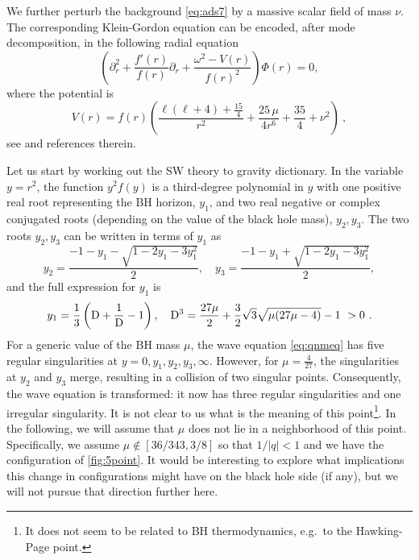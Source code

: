 \documentclass[11pt]{article}
\numberwithin{equation}{section}
\newcommand{\be}{\begin{equation}}
\newcommand{\ee}{\end{equation}}
\begin{document}
We further perturb the background \eqref{eq:ads7} by a massive scalar field of mass $\nu$. 
%
The corresponding Klein-Gordon equation can be encoded, after mode decomposition, in the following radial equation 
\begin{equation}\label{eq:qnmeq}
\left(\partial^2_r + \frac{f'(r)}{f(r)} \partial_r +\frac{\omega^2-V(r)}{f(r)^2}\right)\Phi(r)=0,
\end{equation}
where the potential is  
\begin{equation}
V(r)= f(r)\left(\frac{\ell(\ell+4)+\frac{15}{4}}{r^2}+\frac{25\,\mu}{4 r^6}+\frac{35}{4}+\nu^2\right)~,
\end{equation}
see \cite{review} and references therein.
 
Let us start by working out the SW theory to gravity dictionary. In the variable $y=r^2$, the function $y^2f(y)$ is a third-degree polynomial in $y$ with one positive real root representing the BH horizon, $y_1$, and two real negative or complex conjugated roots (depending on the value of the black hole mass), $y_2,y_3$. The two roots $y_2,y_3$ can be written in terms of $y_1$ as
\begin{equation}
y_2=\frac{-1-y_1-\sqrt{1-2y_1-3y_1^2}}{2},\quad y_3=\frac{-1-y_1+\sqrt{1-2y_1-3y_1^2}}{2},
\end{equation}
and the full expression for $y_1$ is
\be y_1= {1\over 3}\left({\rm D} +\frac{1}{\rm D}-1\right), \quad {\rm D}^3= \frac{27 \mu }{2}+\frac{3}{2} \sqrt{3} \sqrt{\mu  (27 \mu -4)}-1~>0~.\ee
For a generic value of the BH mass $\mu$, the wave equation \eqref{eq:qnmeq} has five regular singularities at $y=0, y_1, y_2, y_3,\infty$. However, for  $\mu = \frac{4}{27}$, the singularities at  $y_2$  and $y_3$ merge, resulting in a collision of two singular points. Consequently, the wave equation is transformed: it now has three regular singularities and one irregular singularity. It is not clear to us what is the meaning of this point\footnote{It does not seem to be related to BH thermodynamics, e.g.~to the Hawking-Page point.}. In the following, we will assume that $\mu$ does not lie in a neighborhood of this point. Specifically, we assume $\mu\notin[36/343, 3/8]$ so that $1/|q|<1$ and we have the configuration of \autoref{fig:5point}. It would be interesting to explore what implications this change in configurations might have on the black hole side (if any), but we will not pursue that direction further here.
\end{document}
